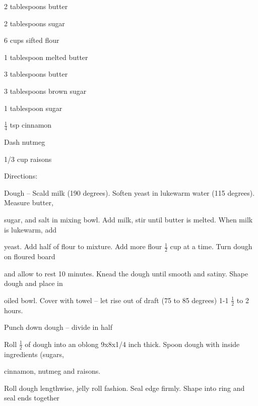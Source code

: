 \documentclass[a4paper,portrait,12pt]{book}
\begin{document}
2 tablespoons butter




2 tablespoons sugar




6 cups sifted flour




1 tablespoon melted butter




3 tablespoons butter




3 tablespoons brown sugar




1 tablespoon sugar




$\frac{1}{4}$ tsp cinnamon




Dash nutmeg




1/3 cup raisons




Directions:




Dough -- Scald milk (190 degrees). Soften yeast in lukewarm water (115 degrees). Measure butter,




sugar, and salt in mixing bowl. Add milk, stir until butter is melted. When milk is lukewarm, add




yeast. Add half of flour to mixture. Add more flour $\frac{1}{2}$ cup at a time. Turn dough on floured board




and allow to rest 10 minutes. Knead the dough until smooth and satiny. Shape dough and place in




oiled bowl. Cover with towel -- let rise out of draft (75 to 85 degrees) 1-1 $\frac{1}{2}$ to 2 hours.




Punch down dough -- divide in half




Roll $\frac{1}{2}$ of dough into an oblong 9x8x1/4 inch thick. Spoon dough with inside ingredients (sugars,




cinnamon, nutmeg and raisons.




Roll dough lengthwise, jelly roll fashion. Seal edge firmly. Shape into ring and seal ends together
\end{document}
